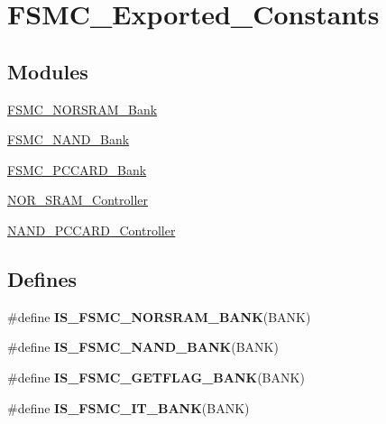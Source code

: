 \hypertarget{group__FSMC__Exported__Constants}{
\section{FSMC\_\-Exported\_\-Constants}
\label{group__FSMC__Exported__Constants}
}
\subsection*{Modules}
\begin{DoxyCompactItemize}
\item 
\hyperlink{group__FSMC__NORSRAM__Bank}{FSMC\_\-NORSRAM\_\-Bank}
\item 
\hyperlink{group__FSMC__NAND__Bank}{FSMC\_\-NAND\_\-Bank}
\item 
\hyperlink{group__FSMC__PCCARD__Bank}{FSMC\_\-PCCARD\_\-Bank}
\item 
\hyperlink{group__NOR__SRAM__Controller}{NOR\_\-SRAM\_\-Controller}
\item 
\hyperlink{group__NAND__PCCARD__Controller}{NAND\_\-PCCARD\_\-Controller}
\end{DoxyCompactItemize}
\subsection*{Defines}
\begin{DoxyCompactItemize}
\item 
\#define {\bfseries IS\_\-FSMC\_\-NORSRAM\_\-BANK}(BANK)
\item 
\#define {\bfseries IS\_\-FSMC\_\-NAND\_\-BANK}(BANK)
\item 
\#define {\bfseries IS\_\-FSMC\_\-GETFLAG\_\-BANK}(BANK)
\item 
\#define {\bfseries IS\_\-FSMC\_\-IT\_\-BANK}(BANK)
\end{DoxyCompactItemize}


